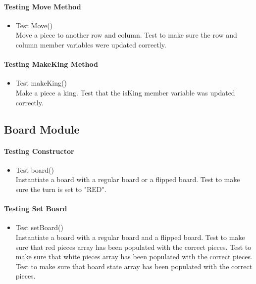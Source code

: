 \documentclass[12pt, titlepage]{article}
\begin{document}
\paragraph{Testing Move Method}
\begin{itemize}
    \item{}Test Move()\\
    Move a piece to another row and column. Test to make sure the row and column member variables were updated correctly.
\end{itemize}

\paragraph{Testing MakeKing Method}
\begin{itemize}
    \item{}Test makeKing()\\
    Make a piece a king. Test that the isKing member variable was updated correctly.
\end{itemize}

\subsection{Board Module}
\paragraph{Testing Constructor}
\begin{itemize}
    \item{}Test board()\\
    Instantiate a board with a regular board or a flipped board. Test to make sure the turn is set to "RED".
\end{itemize}

\paragraph{Testing Set Board}
\begin{itemize}
    \item Test setBoard()\\
    Instantiate a board with a regular board and a flipped board. Test to make sure that red pieces array has been populated with the correct pieces. Test to make sure that white pieces array has been populated with the correct pieces. Test to make sure that board state array has been populated with the correct pieces.
\end{itemize}
\end{document}

